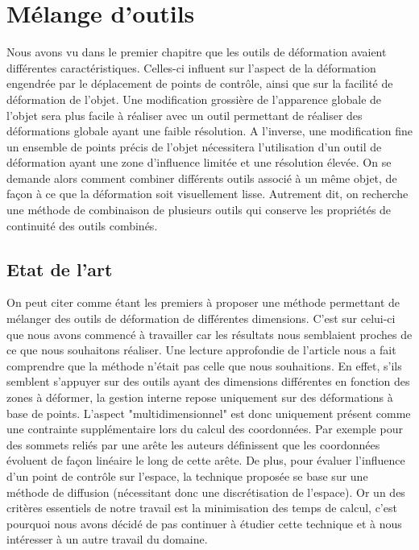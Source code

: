 

\chapter{Mélange d'outils}

\graphicspath{ {Chapter3/Chapter3Figs/PNG/}
  {Chapter3/Chapter3Figs/PDF/} {Chapter3/Chapter3Figs/} }

Nous avons vu dans le premier chapitre que les outils de déformation avaient
différentes caractéristiques. Celles-ci influent sur l'aspect de la
déformation engendrée par le déplacement de points de contrôle, ainsi que sur
la facilité de déformation de l'objet. Une modification grossière de
l'apparence globale de l'objet sera plus facile à réaliser avec un outil
permettant de réaliser des déformations globale ayant une faible résolution. A
l'inverse, une modification fine un ensemble de points précis de l'objet
nécessitera l'utilisation d'un outil de déformation ayant une zone d'influence
limitée et une résolution élevée. On se demande alors comment combiner
différents outils associé à un même objet, de façon à ce que la déformation
soit visuellement lisse. Autrement dit, on recherche une méthode de
combinaison de plusieurs outils qui conserve les propriétés de continuité des
outils combinés.

\section{Etat de l'art}

On peut citer \cite{JBPS11} comme étant les premiers à proposer une méthode
permettant de mélanger des outils de déformation de différentes dimensions.
C'est sur celui-ci que nous avons commencé à travailler car les résultats nous
semblaient proches de ce que nous souhaitons réaliser. Une lecture approfondie
de l'article nous a fait comprendre que la méthode n'était pas celle que nous
souhaitions. En effet, s'ils semblent s'appuyer sur des outils ayant des
dimensions différentes en fonction des zones à déformer, la gestion interne
repose uniquement sur des déformations à base de points. L'aspect
"multidimensionnel" est donc uniquement présent comme une contrainte
supplémentaire lors du calcul des coordonnées. Par exemple pour des sommets
reliés par une arête les auteurs définissent que les coordonnées évoluent de
façon linéaire le long de cette arête. De plus, pour évaluer l'influence d'un
point de contrôle sur l'espace, la technique proposée se base sur une méthode de
diffusion (nécessitant donc une discrétisation de l'espace). Or un des critères
essentiels de notre travail est la minimisation des temps de calcul, c'est
pourquoi nous avons décidé de pas continuer à étudier cette technique et à nous
intéresser à un autre travail du domaine.

